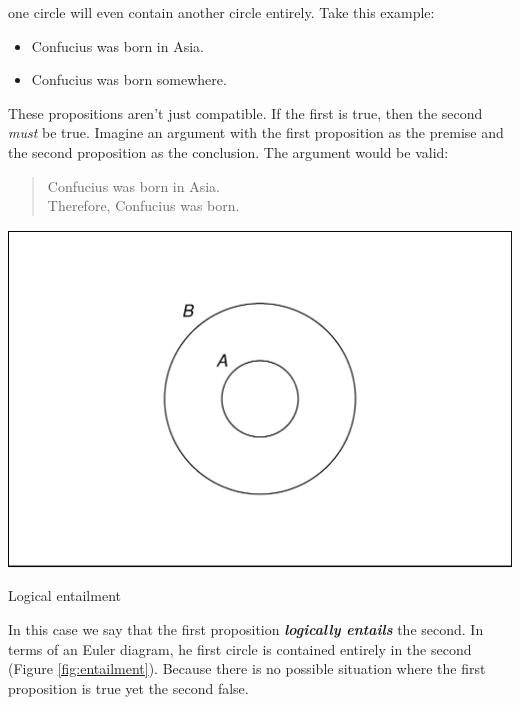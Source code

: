 \documentclass[justified]{tufte-book}
\providecommand{\tightlist}{%
  \setlength{\itemsep}{0pt}\setlength{\parskip}{0pt}}
\newenvironment{argument}{\begin{quote}\normalsize}{\end{quote}}
\theoremstyle{definition}
\theoremstyle{definition}
\theoremstyle{definition}
\theoremstyle{remark}
\begin{document}
 one circle will even contain another circle entirely. Take this example:

\begin{itemize}
\tightlist
\item
  Confucius was born in Asia.
\item
  Confucius was born somewhere.
\end{itemize}

These propositions aren't just compatible. If the first is true, then the second \emph{must} be true. Imagine an argument with the first proposition as the premise and the second proposition as the conclusion. The argument would be valid:
\begin{argument}
Confucius was born in Asia.\\
Therefore, Confucius was born.
\end{argument}
\begin{marginfigure}
\includegraphics{_main_files/figure-latex/entailment-1} \caption[Logical entailment]{Logical entailment}\label{fig:entailment}
\end{marginfigure}
In this case we say that the first proposition \textbf{\emph{logically entails}} the second. In terms of an Euler diagram, he first circle is contained entirely in the second (Figure \ref{fig:entailment}). Because there is no possible situation where the first proposition is true yet the second false.
\end{document}
